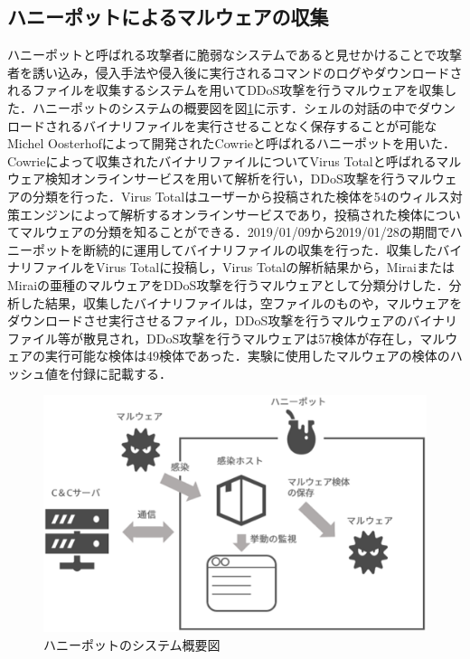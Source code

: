 \subsection{ハニーポットによるマルウェアの収集}
ハニーポットと呼ばれる攻撃者に脆弱なシステムであると見せかけることで攻撃者を誘い込み，侵入手法や侵入後に実行されるコマンドのログやダウンロードされるファイルを収集するシステムを用いてDDoS攻撃を行うマルウェアを収集した．ハニーポットのシステムの概要図を図\ref{fig:honey}に示す．シェルの対話の中でダウンロードされるバイナリファイルを実行させることなく保存することが可能なMichel Oosterhofによって開発されたCowrie\cite{Cowrie}と呼ばれるハニーポットを用いた．Cowrieによって収集されたバイナリファイルについてVirus Totalと呼ばれるマルウェア検知オンラインサービスを用いて解析を行い，DDoS攻撃を行うマルウェアの分類を行った．Virus Total\cite{Virus}はユーザーから投稿された検体を54のウィルス対策エンジンによって解析するオンラインサービスであり，投稿された検体についてマルウェアの分類を知ることができる．2019/01/09から2019/01/28の期間でハニーポットを断続的に運用してバイナリファイルの収集を行った．収集したバイナリファイルをVirus Totalに投稿し，Virus Totalの解析結果から，MiraiまたはMiraiの亜種のマルウェアをDDoS攻撃を行うマルウェアとして分類分けした．分析した結果，収集したバイナリファイルは，空ファイルのものや，マルウェアをダウンロードさせ実行させるファイル，DDoS攻撃を行うマルウェアのバイナリファイル等が散見され，DDoS攻撃を行うマルウェアは57検体が存在し，マルウェアの実行可能な検体は49検体であった．実験に使用したマルウェアの検体のハッシュ値を付録に記載する．
\begin{figure}[h]
    \centering
       \includegraphics[width=120mm]{figures/honey.eps}
    \caption{ハニーポットのシステム概要図}
    \label{fig:honey}
\end{figure}

